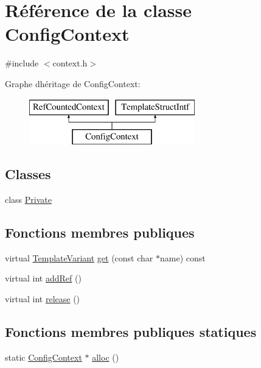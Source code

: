 \hypertarget{class_config_context}{}\section{Référence de la classe Config\+Context}
\label{class_config_context}


{\ttfamily \#include $<$context.\+h$>$}

Graphe d\textquotesingle{}héritage de Config\+Context\+:\begin{figure}[H]
\begin{center}
\leavevmode
\includegraphics[height=2.000000cm]{class_config_context}
\end{center}
\end{figure}
\subsection*{Classes}
\begin{DoxyCompactItemize}
\item 
class \hyperlink{class_config_context_1_1_private}{Private}
\end{DoxyCompactItemize}
\subsection*{Fonctions membres publiques}
\begin{DoxyCompactItemize}
\item 
virtual \hyperlink{class_template_variant}{Template\+Variant} \hyperlink{class_config_context_acdf5915040b29592410d712eccfd4b11}{get} (const char $\ast$name) const 
\item 
virtual int \hyperlink{class_config_context_a6e870043f96de613f7f00e10aa57359e}{add\+Ref} ()
\item 
virtual int \hyperlink{class_config_context_a56eb8523197fa488cb099b47808b7ba7}{release} ()
\end{DoxyCompactItemize}
\subsection*{Fonctions membres publiques statiques}
\begin{DoxyCompactItemize}
\item 
static \hyperlink{class_config_context}{Config\+Context} $\ast$ \hyperlink{class_config_context_ac23123d89936c3646711f891d5ad31da}{alloc} ()
\end{DoxyCompactItemize}


